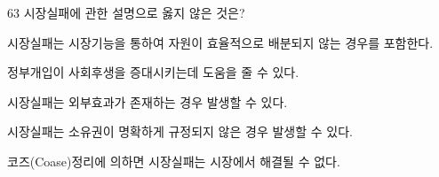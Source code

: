 \begin{question}{63}
시장실패에 관한 설명으로 옳지 않은 것은?
\begin{choices}
  \item 시장실패는 시장기능을 통하여 자원이 효율적으로 배분되지 않는 경우를 포함한다.
  \item 정부개입이 사회후생을 증대시키는데 도움을 줄 수 있다.
  \item 시장실패는 외부효과가 존재하는 경우 발생할 수 있다.
  \item 시장실패는 소유권이 명확하게 규정되지 않은 경우 발생할 수 있다.
  \item 코즈(Coase)정리에 의하면 시장실패는 시장에서 해결될 수 없다.
\end{choices}
\end{question}

